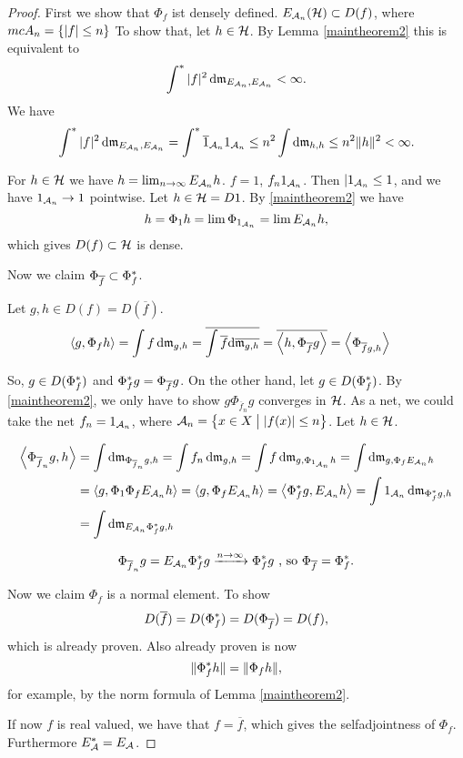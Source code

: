 \begin{proof}

First we show that $\Phi_f$ ist densely defined. 
$E_{\mathcal{A}_n}(\mathcal{H}) \subset D(f)$, where $mc{A}_n = \left\lbrace |f| \leq n \right\rbrace$
To show that, let $h \in \mathcal{H}$. By Lemma \ref{maintheorem2} this is
equivalent to 
\[
\int ^{*} |f|^2 \operatorname{d}\! \mathfrak{m}_{E_{\mathcal{A}_n}, E_{\mathcal{A}_n}} < \infty.
\]
We have 
\begin{align*}
  \int ^{*} |f|^2 \operatorname{d}\! \mathfrak{m}_{E_{\mathcal{A}_n}, E_{\mathcal{A}_n}} = 
  \int ^{*} \overline{1}_{\mathcal{A}_n} 1_{\mathcal{A}_n} \leq
  n^2 \int \operatorname{d}\! \mathfrak{m}_{h,h} \leq n^2 \| h\|^2 < \infty.
\end{align*}

For $h \in \mathcal{H}$ we have $h = \lim_{n \to \infty} E_{\mathcal{A}_n} h$. 
$f = 1$, $f_n 1_{\mathcal{A}_n}$. Then $|1_{\mathcal{A}_n} \leq 1$, and we have
$1_{\mathcal{A}_n} \to 1 $ pointwise.
Let $h \in \mathcal{H} = D{1}$. By \ref{maintheorem2} we have
\[
h = \Phi_1 h = \lim \Phi_{1_{\mathcal{A}_n}} = \lim E_{\mathcal{A}_n} h , 
\]
which gives $D(f) \subset \mathcal{H}$ is dense. 

Now we claim $ \Phi_{\overline{f}} \subset \Phi_f ^{*}$.

Let  $g,h \in D(f) = D(\overline{f})$.
\begin{align*}
  \left\langle g, \Phi_f h \right\rangle &= \int f \operatorname{d}\! \mathfrak{m}_{g,h} 
  = \overline{ \int \overline{f} \text{d}\overline{\mathfrak{m}_{g,h}}} 
  = \overline{ \left\langle h , \Phi_{\overline{f}} g  \right\rangle} 
  = \left\langle \Phi_{\overline{f} g , h} \right\rangle
\end{align*}

So, $g \in D(\Phi_f ^{*})$ and $\Phi_f ^{*} g = \Phi_{\overline{f}} g$.
On the other hand, let $g\in D(\Phi_f ^{*})$.
By \ref{maintheorem2}, we only have to show $g \Phi_{\overline{f}_n}g$
converges in $\mathcal{H}$. As a net, we could take the net $f_n = 1_{\mathcal{A}_n}$,
where $\mathcal{A}_n = \left\lbrace x \in X \bigm | | f(x) | \leq n \right\rbrace$.
Let $h \in \mathcal{H}$.

\begin{align*}
\left\langle  \Phi_{\overline{f}_n} g, h  \right\rangle& = \int \operatorname{d}\! \mathfrak{m}_{\Phi_{\overline{f}_n} g, h}
= \int f_n \operatorname{d}\! \mathfrak{m}_{g,h} 
= \int f \operatorname{d}\! \mathfrak{m}_{g, \Phi_{1_{\mathcal{A}_n }} h }
= \int \operatorname{d}\! \mathfrak{m}_{g, \Phi_f E_{\mathcal{A}_n} h} \\
&= \left\langle g, \Phi_1 \Phi_f E_{\mathcal{A}_n }h  \right\rangle
= \left\langle g, \Phi_f E_{\mathcal{A}_n} h \right\rangle 
= \left\langle \Phi_f ^{*} g, E_{\mathcal{A}_n} h \right\rangle
= \int 1_{\mathcal{A}_n} \operatorname{d}\! \mathfrak{m}_{\Phi_f ^{*} g, h}\\
&= \int \operatorname{d}\! \mathfrak{m}_{E_{\mathcal{A}_n} \Phi_f ^{*} g, h}
\end{align*}

\[
\Phi_{\overline{f}_n} g = E_{\mathcal{A}_n} \Phi_f ^{*} g 
\xrightarrow{n \to \infty} \Phi_f ^{*} g \text{ , so  }
\Phi_{\overline{f}} = \Phi_f ^{*}.
\]


Now we claim $\Phi_f$ is a normal element. To show
\[
D(\overline{f}) = D(\Phi_f ^{*}) = D(\Phi_{\overline{f}}) = D(f),
\]
 which is already proven. Also already proven is now
\[
 \| \Phi_f ^{*} h \| = \| \Phi_f h \|,
\]
for example, by the norm formula of Lemma \ref{maintheorem2}.

If now $f$ is real valued, we have that $f = \overline{f}$, which gives 
the selfadjointness of $\Phi_f$. Furthermore $E_\mathcal{A} ^{*} = E_\mathcal{A}$.

\end{proof}

